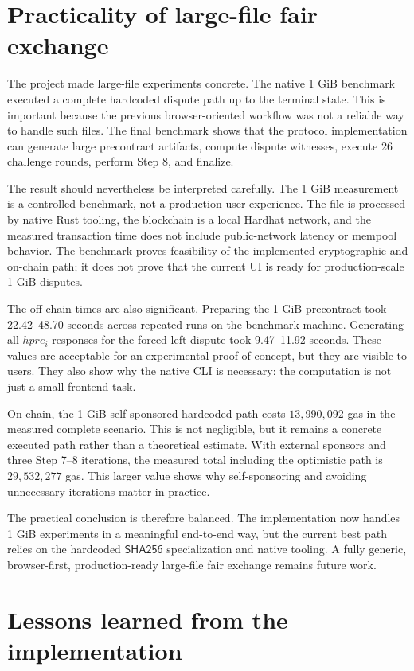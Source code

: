 \section{Practicality of large-file fair exchange}

The project made large-file experiments concrete. The native 1 GiB benchmark executed a
complete hardcoded dispute path up to the terminal state. This is important because the
previous browser-oriented workflow was not a reliable way to handle such files. The final
benchmark shows that the protocol implementation can generate large precontract artifacts,
compute dispute witnesses, execute 26 challenge rounds, perform Step 8, and finalize.

The result should nevertheless be interpreted carefully. The 1 GiB measurement is a
controlled benchmark, not a production user experience. The file is processed by native
Rust tooling, the blockchain is a local Hardhat network, and the measured transaction time
does not include public-network latency or mempool behavior. The benchmark proves
feasibility of the implemented cryptographic and on-chain path; it does not prove that the
current UI is ready for production-scale 1 GiB disputes.

The off-chain times are also significant. Preparing the 1 GiB precontract took
22.42--48.70 seconds across repeated runs on the benchmark machine. Generating all
\(hpre_i\) responses for the forced-left dispute took 9.47--11.92 seconds. These values are acceptable for an
experimental proof of concept, but they are visible to users. They also show why the native
CLI is necessary: the computation is not just a small frontend task.

On-chain, the 1 GiB self-sponsored hardcoded path costs \(13,990,092\) gas in the measured
complete scenario. This is not negligible, but it remains a concrete executed path rather
than a theoretical estimate. With external sponsors and three Step 7--8 iterations, the
measured total including the optimistic path is \(29,532,277\) gas. This larger value shows
why self-sponsoring and avoiding unnecessary iterations matter in practice.

The practical conclusion is therefore balanced. The implementation now handles 1 GiB
experiments in a meaningful end-to-end way, but the current best path relies on the
hardcoded \(\mathsf{SHA256}\) specialization and native tooling. A fully generic,
browser-first, production-ready large-file fair exchange remains future work.

\section{Lessons learned from the implementation}

